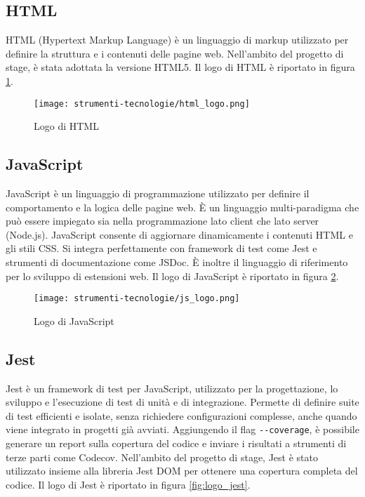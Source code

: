 \subsection*{HTML}

\par HTML (Hypertext Markup Language) è un linguaggio di markup utilizzato per definire la struttura e i contenuti delle pagine web. Nell’ambito del progetto di stage, è stata adottata la versione HTML5. Il logo di HTML è riportato in figura \ref{fig:logo_html}.

\begin{figure}[H]
  \centering 
  \texttt{[image: strumenti-tecnologie/html\_logo.png]} 
  \caption{Logo di HTML}
  \label{fig:logo_html} 
\end{figure}

\subsection*{JavaScript}

\par JavaScript è un linguaggio di programmazione utilizzato per definire il comportamento e la logica delle pagine web. È un linguaggio multi-paradigma che può essere impiegato sia nella programmazione lato client che lato server (Node.js). JavaScript consente di aggiornare dinamicamente i contenuti HTML e gli stili CSS. Si integra perfettamente con \gls{framework} di test come Jest e strumenti di documentazione come JSDoc. È inoltre il linguaggio di riferimento per lo sviluppo di estensioni web. Il logo di JavaScript è riportato in figura \ref{fig:logo_javascript}.

\begin{figure}[H]
  \centering 
  \texttt{[image: strumenti-tecnologie/js\_logo.png]} 
  \caption{Logo di JavaScript}
  \label{fig:logo_javascript} 
\end{figure}

\subsection*{Jest}

\par Jest è un \gls{framework} di test per JavaScript, utilizzato per la progettazione, lo sviluppo e l’esecuzione di test di unità e di integrazione. Permette di definire suite di test efficienti e isolate, senza richiedere configurazioni complesse, anche quando viene integrato in progetti già avviati. Aggiungendo il flag \verb|--coverage|, è possibile generare un report sulla copertura del codice e inviare i risultati a strumenti di terze parti come Codecov. Nell’ambito del progetto di stage, Jest è stato utilizzato insieme alla libreria Jest DOM per ottenere una copertura completa del codice. Il logo di Jest è riportato in figura \ref{fig:logo_jest}.

